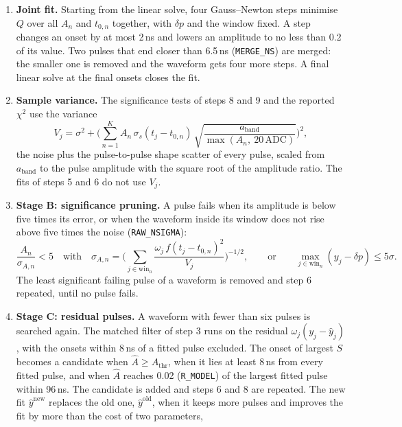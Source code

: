 \documentclass[11pt]{article}
\newcommand{\adc}{\,\mathrm{ADC}}
\newcommand{\code}[1]{\texttt{#1}}
\begin{document}
\begin{enumerate}
\item \textbf{Joint fit.} Starting from the linear solve, four Gauss--Newton steps minimise $Q$ over all $A_n$ and $t_{0,n}$ together, with $\delta p$ and the window fixed. A step changes an onset by at most 2\,ns and lowers an amplitude to no less than 0.2 of its value. Two pulses that end closer than 6.5\,ns (\code{MERGE\_NS}) are merged: the smaller one is removed and the waveform gets four more steps. A final linear solve at the final onsets closes the fit.
\item \textbf{Sample variance.} The significance tests of steps 8 and 9 and the reported $\chi^2$ use the variance
\begin{equation}
V_j = \sigma^2 + \Big( \sum_{n=1}^{K} A_n\, \sigma_s(t_j - t_{0,n})\, \sqrt{\frac{a_{\mathrm{band}}}{\max(A_n,\ 20\adc)}} \Big)^2 ,
\label{eq:vj}
\end{equation}
the noise plus the pulse-to-pulse shape scatter of every pulse, scaled from $a_{\mathrm{band}}$ to the pulse amplitude with the square root of the amplitude ratio. The fits of steps 5 and 6 do not use $V_j$.
\item \textbf{Stage B: significance pruning.} A pulse fails when its amplitude is below five times its error, or when the waveform inside its window does not rise above five times the noise (\code{RAW\_NSIGMA}):
\begin{equation}
\frac{A_n}{\sigma_{A,n}} < 5
\quad\text{with}\quad
\sigma_{A,n} = \Big( \sum_{j \in \mathrm{win}_n} \frac{\omega_j\, f(t_j - t_{0,n})^2}{V_j} \Big)^{-1/2},
\qquad\text{or}\qquad
\max_{j \in \mathrm{win}_n} (y_j - \delta p) \le 5\sigma .
\label{eq:prune}
\end{equation}
The least significant failing pulse of a waveform is removed and step 6 repeated, until no pulse fails.
\item \textbf{Stage C: residual pulses.} A waveform with fewer than six pulses is searched again. The matched filter of step 3 runs on the residual $\omega_j (y_j - \hat y_j)$, with the onsets within 8\,ns of a fitted pulse excluded. The onset of largest $S$ becomes a candidate when $\hat A \ge A_{\mathrm{thr}}$, when it lies at least 8\,ns from every fitted pulse, and when $\hat A$ reaches 0.02 (\code{R\_MODEL}) of the largest fitted pulse within 96\,ns. The candidate is added and steps 6 and 8 are repeated. The new fit $\hat y^{\mathrm{new}}$ replaces the old one, $\hat y^{\mathrm{old}}$, when it keeps more pulses and improves the fit by more than the cost of two parameters,
\begin{equation}

\end{equation}
\end{enumerate}
\end{document}
